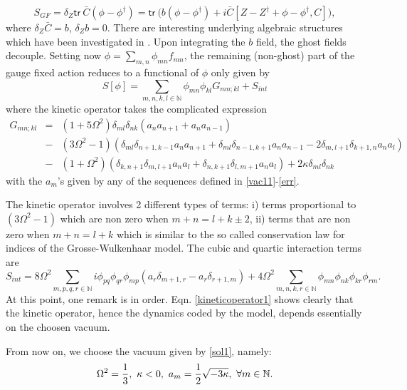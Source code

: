 \documentclass[a4paper,11pt,twoside]{article}
\numberwithin{equation}{section}
\newcommand{\tr}{\mathsf{tr}}
\theoremstyle{nonumberplain}
\begin{document}
\begin{equation}
S_{GF}=\delta_Z\tr\ {\bar{C}}(\phi-\phi^\dag)=\tr\ \bigg( b(\phi-\phi^\dag)+i{\bar{C}}[Z-Z^\dag+\phi-\phi^\dag,C]\bigg)\label{gaugefixingphi},
\end{equation}
where $\delta_Z{\bar{C}}=b$, $\delta_Zb=0$. There are interesting underlying algebraic structures which have been investigated in \cite{rsw}. Upon integrating the $b$ field, the ghost fields decouple. Setting now $\phi=\sum_{m,n}\phi_{mn}f_{mn}$, the remaining (non-ghost) part of the gauge fixed action reduces to a functional of $\phi$ only given by
\begin{equation}
S[\phi]=\sum_{m,n,k,l\in\mathbb{N}} \phi_{mn}\phi_{kl}G_{mn;kl}+S_{int}\label{actmatrix}
\end{equation}
where the kinetic operator takes the complicated expression
\begin{eqnarray}
G_{mn;kl} &=&(1+5\Omega^2)\delta_{ml}\delta_{nk}(a_na_{n+1}+a_na_{n-1})\nonumber\\
&-&(3\Omega^2-1)(\delta_{ml}\delta_{n+1,k-1}a_na_{n+1}+\delta_{ml}\delta_{n-1,k+1}a_na_{n-1}
-2\delta_{m,l+1}\delta_{k+1,n}a_na_l)\nonumber \\
&-&(1+\Omega^2)(\delta_{k,n+1}\delta_{m,l+1}a_na_l+\delta_{n,k+1}\delta_{l,m+1}a_na_l)+2\kappa\delta_{ml}\delta_{nk}\label{kineticoperator1}
\end{eqnarray}
with the $a_m$'s given by any of the sequences defined in \eqref{vac11}-\eqref{err}. \par
The kinetic operator involves 2 different types of terms: i) terms proportional to $(3\Omega^2-1)$ which are non zero when $m+n=l+k\pm2$, ii) terms that are non zero when $m+n=l+k$ which is similar to the so called conservation law for indices of the Grosse-Wulkenhaar model. The cubic and quartic interaction terms are
\begin{equation}
S_{int}=8\Omega^2\sum_{m,p,q,r\in\mathbb{N}}i\phi_{pq}\phi_{qr}\phi_{mp}(a_r\delta_{m+1,r}-a_r\delta_{r+1,m})+
4\Omega^2\sum_{m,n,k,r\in\mathbb{N}}\phi_{mn}\phi_{nk}\phi_{kr}\phi_{rm}\label{interactmatrix}.
\end{equation}
At this point, one remark is in order. Eqn. \eqref{kineticoperator1} shows clearly that the kinetic operator, hence the dynamics coded by the model, depends essentially on the choosen vacuum.\par
From now on, we choose the vacuum given by \eqref{sol1}, namely: 
\begin{equation}
\Omega^2={{1}\over{3}},\ \kappa<0,\ a_m={{1}\over{2}}{\sqrt{ -3\kappa}},\ \forall m\in\mathbb{N}\nonumber.
\end{equation}
\end{document}
